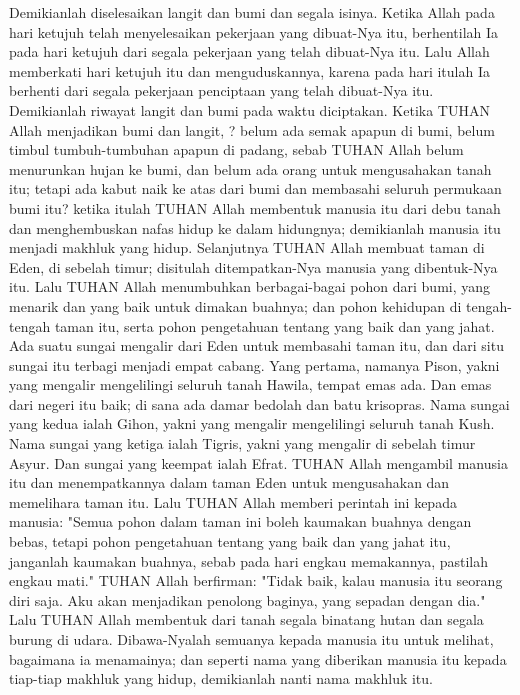 \begin{biblechapter}
\verse Demikianlah diselesaikan langit dan bumi dan segala isinya.
\verse Ketika Allah pada hari ketujuh telah menyelesaikan pekerjaan yang dibuat-Nya itu, berhentilah Ia pada hari ketujuh dari segala pekerjaan yang telah dibuat-Nya itu.
\verse Lalu Allah memberkati hari ketujuh itu dan menguduskannya, karena pada hari itulah Ia berhenti dari segala pekerjaan penciptaan yang telah dibuat-Nya itu.
\verse Demikianlah riwayat langit dan bumi pada waktu diciptakan. Ketika TUHAN Allah menjadikan bumi dan langit, ?
\verse belum ada semak apapun di bumi, belum timbul tumbuh-tumbuhan apapun di padang, sebab TUHAN Allah belum menurunkan hujan ke bumi, dan belum ada orang untuk mengusahakan tanah itu;
\verse tetapi ada kabut naik ke atas dari bumi dan membasahi seluruh permukaan bumi itu?
\verse ketika itulah TUHAN Allah membentuk manusia itu dari debu tanah dan menghembuskan nafas hidup ke dalam hidungnya; demikianlah manusia itu menjadi makhluk yang hidup.
\verse Selanjutnya TUHAN Allah membuat taman di Eden, di sebelah timur; disitulah ditempatkan-Nya manusia yang dibentuk-Nya itu.
\verse Lalu TUHAN Allah menumbuhkan berbagai-bagai pohon dari bumi, yang menarik dan yang baik untuk dimakan buahnya; dan pohon kehidupan di tengah-tengah taman itu, serta pohon pengetahuan tentang yang baik dan yang jahat.
\verse Ada suatu sungai mengalir dari Eden untuk membasahi taman itu, dan dari situ sungai itu terbagi menjadi empat cabang.
\verse Yang pertama, namanya Pison, yakni yang mengalir mengelilingi seluruh tanah Hawila, tempat emas ada.
\verse Dan emas dari negeri itu baik; di sana ada damar bedolah dan batu krisopras.
\verse Nama sungai yang kedua ialah Gihon, yakni yang mengalir mengelilingi seluruh tanah Kush.
\verse Nama sungai yang ketiga ialah Tigris, yakni yang mengalir di sebelah timur Asyur. Dan sungai yang keempat ialah Efrat.
\verse TUHAN Allah mengambil manusia itu dan menempatkannya dalam taman Eden untuk mengusahakan dan memelihara taman itu.
\verse Lalu TUHAN Allah memberi perintah ini kepada manusia: "Semua pohon dalam taman ini boleh kaumakan buahnya dengan bebas,
\verse tetapi pohon pengetahuan tentang yang baik dan yang jahat itu, janganlah kaumakan buahnya, sebab pada hari engkau memakannya, pastilah engkau mati."
\verse TUHAN Allah berfirman: "Tidak baik, kalau manusia itu seorang diri saja. Aku akan menjadikan penolong baginya, yang sepadan dengan dia."
\verse Lalu TUHAN Allah membentuk dari tanah segala binatang hutan dan segala burung di udara. Dibawa-Nyalah semuanya kepada manusia itu untuk melihat, bagaimana ia menamainya; dan seperti nama yang diberikan manusia itu kepada tiap-tiap makhluk yang hidup, demikianlah nanti nama makhluk itu.

\end{biblechapter}
